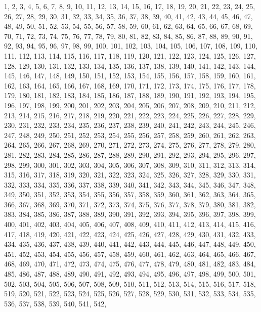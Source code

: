 1,
2,
3,
4,
5,
6,
7,
8,
9,
10,
11,
12,
13,
14,
15,
16,
17,
18,
19,
20,
21,
22,
23,
24,
25,
26,
27,
28,
29,
30,
31,
32,
33,
34,
35,
36,
37,
38,
39,
40,
41,
42,
43,
44,
45,
46,
47,
48,
49,
50,
51,
52,
53,
54,
55,
56,
57,
58,
59,
60,
61,
62,
63,
64,
65,
66,
67,
68,
69,
70,
71,
72,
73,
74,
75,
76,
77,
78,
79,
80,
81,
82,
83,
84,
85,
86,
87,
88,
89,
90,
91,
92,
93,
94,
95,
96,
97,
98,
99,
100,
101,
102,
103,
104,
105,
106,
107,
108,
109,
110,
111,
112,
113,
114,
115,
116,
117,
118,
119,
120,
121,
122,
123,
124,
125,
126,
127,
128,
129,
130,
131,
132,
133,
134,
135,
136,
137,
138,
139,
140,
141,
142,
143,
144,
145,
146,
147,
148,
149,
150,
151,
152,
153,
154,
155,
156,
157,
158,
159,
160,
161,
162,
163,
164,
165,
166,
167,
168,
169,
170,
171,
172,
173,
174,
175,
176,
177,
178,
179,
180,
181,
182,
183,
184,
185,
186,
187,
188,
189,
190,
191,
192,
193,
194,
195,
196,
197,
198,
199,
200,
201,
202,
203,
204,
205,
206,
207,
208,
209,
210,
211,
212,
213,
214,
215,
216,
217,
218,
219,
220,
221,
222,
223,
224,
225,
226,
227,
228,
229,
230,
231,
232,
233,
234,
235,
236,
237,
238,
239,
240,
241,
242,
243,
244,
245,
246,
247,
248,
249,
250,
251,
252,
253,
254,
255,
256,
257,
258,
259,
260,
261,
262,
263,
264,
265,
266,
267,
268,
269,
270,
271,
272,
273,
274,
275,
276,
277,
278,
279,
280,
281,
282,
283,
284,
285,
286,
287,
288,
289,
290,
291,
292,
293,
294,
295,
296,
297,
298,
299,
300,
301,
302,
303,
304,
305,
306,
307,
308,
309,
310,
311,
312,
313,
314,
315,
316,
317,
318,
319,
320,
321,
322,
323,
324,
325,
326,
327,
328,
329,
330,
331,
332,
333,
334,
335,
336,
337,
338,
339,
340,
341,
342,
343,
344,
345,
346,
347,
348,
349,
350,
351,
352,
353,
354,
355,
356,
357,
358,
359,
360,
361,
362,
363,
364,
365,
366,
367,
368,
369,
370,
371,
372,
373,
374,
375,
376,
377,
378,
379,
380,
381,
382,
383,
384,
385,
386,
387,
388,
389,
390,
391,
392,
393,
394,
395,
396,
397,
398,
399,
400,
401,
402,
403,
404,
405,
406,
407,
408,
409,
410,
411,
412,
413,
414,
415,
416,
417,
418,
419,
420,
421,
422,
423,
424,
425,
426,
427,
428,
429,
430,
431,
432,
433,
434,
435,
436,
437,
438,
439,
440,
441,
442,
443,
444,
445,
446,
447,
448,
449,
450,
451,
452,
453,
454,
455,
456,
457,
458,
459,
460,
461,
462,
463,
464,
465,
466,
467,
468,
469,
470,
471,
472,
473,
474,
475,
476,
477,
478,
479,
480,
481,
482,
483,
484,
485,
486,
487,
488,
489,
490,
491,
492,
493,
494,
495,
496,
497,
498,
499,
500,
501,
502,
503,
504,
505,
506,
507,
508,
509,
510,
511,
512,
513,
514,
515,
516,
517,
518,
519,
520,
521,
522,
523,
524,
525,
526,
527,
528,
529,
530,
531,
532,
533,
534,
535,
536,
537,
538,
539,
540,
541,
542,
